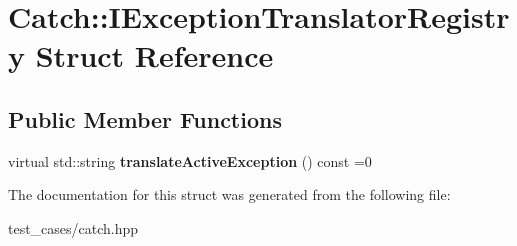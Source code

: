 \hypertarget{structCatch_1_1IExceptionTranslatorRegistry}{}\section{Catch\+:\+:I\+Exception\+Translator\+Registry Struct Reference}
\label{structCatch_1_1IExceptionTranslatorRegistry}
\subsection*{Public Member Functions}
\begin{DoxyCompactItemize}
\item 
\mbox{\label{structCatch_1_1IExceptionTranslatorRegistry_af76ae8c331a17f2a94c9720bc0d686bb}} 
virtual std\+::string {\bfseries translate\+Active\+Exception} () const =0
\end{DoxyCompactItemize}


The documentation for this struct was generated from the following file\+:\begin{DoxyCompactItemize}
\item 
test\+\_\+cases/catch.\+hpp\end{DoxyCompactItemize}
